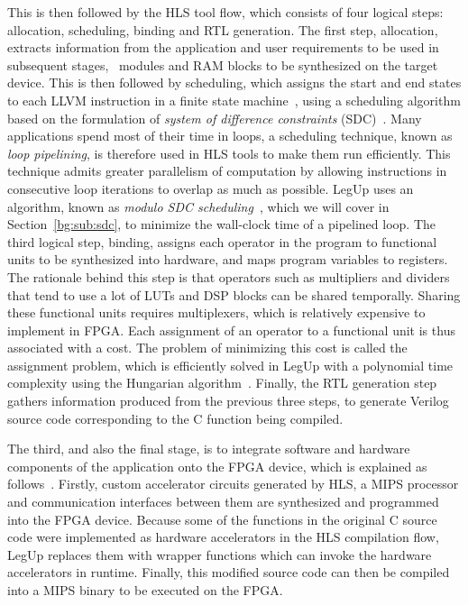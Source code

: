 This is then followed by the HLS tool flow, which consists of four logical
steps: allocation, scheduling, binding and RTL generation.  The first
step, allocation, extracts information from the application and user
requirements to be used in subsequent stages, \eg~modules and RAM blocks to be
synthesized on the target device.  This is then followed by scheduling, which
assigns the start and end states to each LLVM instruction in a finite state
machine~\cite{legup}, using a scheduling algorithm based on the formulation
of \emph{system of difference constraints} (SDC)~\cite{legup, canis13,
cong06}.  Many applications spend most of their time in loops, a scheduling
technique, known as \emph{loop pipelining}, is therefore used in HLS tools
to make them run efficiently.  This technique admits greater parallelism of
computation by allowing instructions in consecutive loop iterations to overlap
as much as possible.  LegUp uses an algorithm, known as \emph{modulo SDC
scheduling}~\cite{canis14}, which we will cover in Section~\ref{bg:sub:sdc},
to minimize the wall-clock time of a pipelined loop.  The third logical
step, binding, assigns each operator in the program to functional units to
be synthesized into hardware, and maps program variables to registers.  The
rationale behind this step is that operators such as multipliers and dividers
that tend to use a lot of LUTs and DSP blocks can be shared temporally.
Sharing these functional units requires multiplexers, which is relatively
expensive to implement in FPGA\@.  Each assignment of an operator to a
functional unit is thus associated with a cost.  The problem of minimizing this
cost is called the assignment problem, which is efficiently solved in LegUp
with a polynomial time complexity using the Hungarian algorithm~\cite{canis13,
kuhn10}.  Finally, the RTL generation step gathers information produced from
the previous three steps, to generate Verilog source code corresponding to the
C function being compiled.

The third, and also the final stage, is to integrate software and hardware
components of the application onto the FPGA device, which is explained as
follows~\cite{canis13}.  Firstly, custom accelerator circuits generated by HLS,
a MIPS processor and communication interfaces between them are synthesized
and programmed into the FPGA device.  Because some of the functions in the
original C source code were implemented as hardware accelerators in the HLS
compilation flow, LegUp replaces them with wrapper functions which can invoke
the hardware accelerators in runtime.  Finally, this modified source code can
then be compiled into a MIPS binary to be executed on the FPGA\@.


